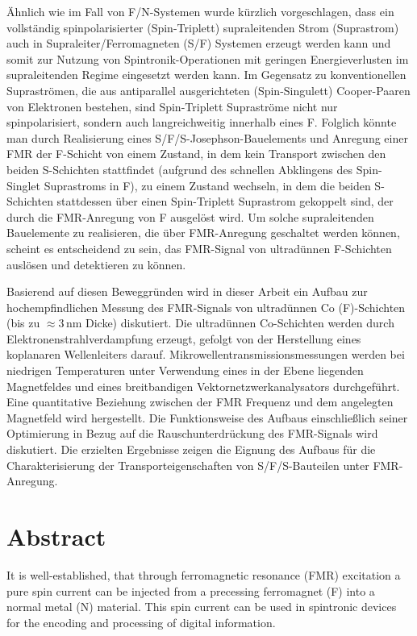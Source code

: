 Ähnlich wie im Fall von F/N-Systemen wurde kürzlich vorgeschlagen, dass ein vollständig spinpolarisierter (Spin-Triplett) supraleitenden Strom (Suprastrom) auch in Supraleiter/Ferromagneten (S/F) Systemen erzeugt werden kann und somit zur Nutzung von Spintronik-Operationen mit geringen Energieverlusten im supraleitenden Regime eingesetzt werden kann. Im Gegensatz zu konventionellen Supraströmen, die aus antiparallel ausgerichteten (Spin-Singulett) Cooper-Paaren von Elektronen bestehen, sind Spin-Triplett Supraströme nicht nur spinpolarisiert, sondern auch langreichweitig innerhalb eines F. Folglich könnte man durch Realisierung eines S/F/S-Josephson-Bauelements und Anregung einer FMR der F-Schicht von einem Zustand, in dem kein Transport zwischen den beiden S-Schichten stattfindet (aufgrund des schnellen Abklingens des Spin-Singlet Suprastroms in F), zu einem Zustand wechseln, in dem die beiden S-Schichten stattdessen über einen Spin-Triplett Suprastrom gekoppelt sind, der durch die FMR-Anregung von F ausgelöst wird. Um solche supraleitenden Bauelemente zu realisieren, die über FMR-Anregung geschaltet werden können, scheint es entscheidend zu sein, das FMR-Signal von ultradünnen F-Schichten auslösen und detektieren zu können.

Basierend auf diesen Beweggründen wird in dieser Arbeit ein Aufbau zur hochempfindlichen Messung des FMR-Signals von ultradünnen Co (F)-Schichten (bis zu $\approx3\,$nm Dicke) diskutiert. Die ultradünnen Co-Schichten werden durch Elektronenstrahlverdampfung erzeugt, gefolgt von der Herstellung eines koplanaren Wellenleiters darauf. Mikrowellentransmissionsmessungen werden bei niedrigen Temperaturen unter Verwendung eines in der Ebene liegenden Magnetfeldes und eines breitbandigen Vektornetzwerkanalysators durchgeführt. Eine quantitative Beziehung zwischen der FMR Frequenz und dem angelegten Magnetfeld wird hergestellt. Die Funktionsweise des Aufbaus einschlie\ss lich seiner Optimierung in Bezug auf die Rauschunterdrückung des FMR-Signals wird diskutiert. Die erzielten Ergebnisse zeigen die Eignung des Aufbaus für die Charakterisierung der Transporteigenschaften von S/F/S-Bauteilen unter FMR-Anregung.


\chapter*{Abstract}
It is well-established, that through ferromagnetic resonance (FMR) excitation a pure spin current can be injected from a precessing ferromagnet (F) into a normal metal (N) material. This spin current can be used in spintronic devices for the encoding and processing of digital information.


